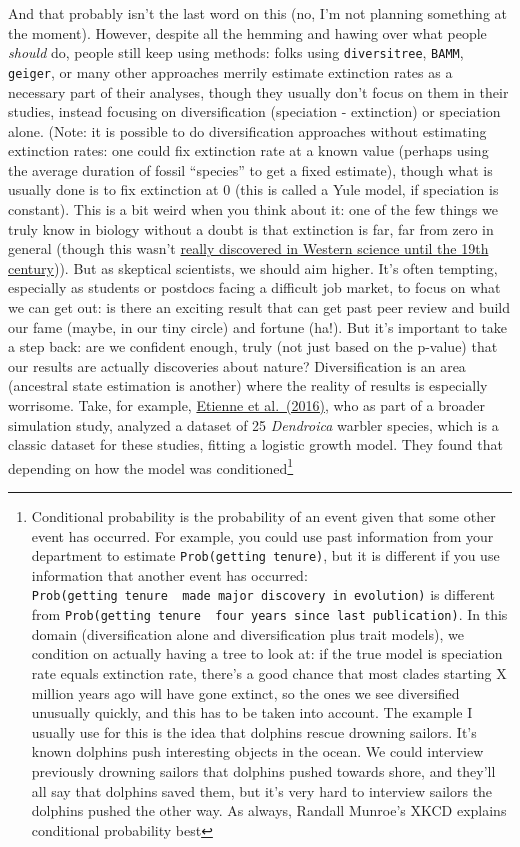 \documentclass[
]{article}
\begin{document}
And that probably isn't the last word on this (no, I'm not planning something at the moment). However, despite all the hemming and hawing over what people \emph{should} do, people still keep using methods: folks using \texttt{diversitree}, \texttt{BAMM}, \texttt{geiger}, or many other approaches merrily estimate extinction rates as a necessary part of their analyses, though they usually don't focus on them in their studies, instead focusing on diversification (speciation - extinction) or speciation alone. (Note: it is possible to do diversification approaches without estimating extinction rates: one could fix extinction rate at a known value (perhaps using the average duration of fossil ``species'' to get a fixed estimate), though what is usually done is to fix extinction at 0 (this is called a Yule model, if speciation is constant). This is a bit weird when you think about it: one of the few things we truly know in biology without a doubt is that extinction is far, far from zero in general (though this wasn't \href{http://www.ucmp.berkeley.edu/mammal/artio/irishelk.html}{really discovered in Western science until the 19th century})). But as skeptical scientists, we should aim higher. It's often tempting, especially as students or postdocs facing a difficult job market, to focus on what we can get out: is there an exciting result that can get past peer review and build our fame (maybe, in our tiny circle) and fortune (ha!). But it's important to take a step back: are we confident enough, truly (not just based on the p-value) that our results are actually discoveries about nature? Diversification is an area (ancestral state estimation is another) where the reality of results is especially worrisome. Take, for example, \href{http://onlinelibrary.wiley.com/doi/10.1111/2041-210X.12565/abstract}{Etienne et al.~(2016)}, who as part of a broader simulation study, analyzed a dataset of 25 \emph{Dendroica} warbler species, which is a classic dataset for these studies, fitting a logistic growth model. They found that depending on how the model was conditioned\footnote{Conditional probability is the probability of an event given that some other event has occurred. For example, you could use past information from your department to estimate \texttt{Prob(getting\ tenure)}, but it is different if you use information that another event has occurred: \texttt{Prob(getting\ tenure\ \textbar{}\ made\ major\ discovery\ in\ evolution)} is different from \texttt{Prob(getting\ tenure\ \textbar{}\ four\ years\ since\ last\ publication)}. In this domain (diversification alone and diversification plus trait models), we condition on actually having a tree to look at: if the true model is speciation rate equals extinction rate, there's a good chance that most clades starting X million years ago will have gone extinct, so the ones we see diversified unusually quickly, and this has to be taken into account. The example I usually use for this is the idea that dolphins rescue drowning sailors. It's known dolphins push interesting objects in the ocean. We could interview previously drowning sailors that dolphins pushed towards shore, and they'll all say that dolphins saved them, but it's very hard to interview sailors the dolphins pushed the other way. As always, Randall Munroe's XKCD explains conditional probability best
}
\end{document}
